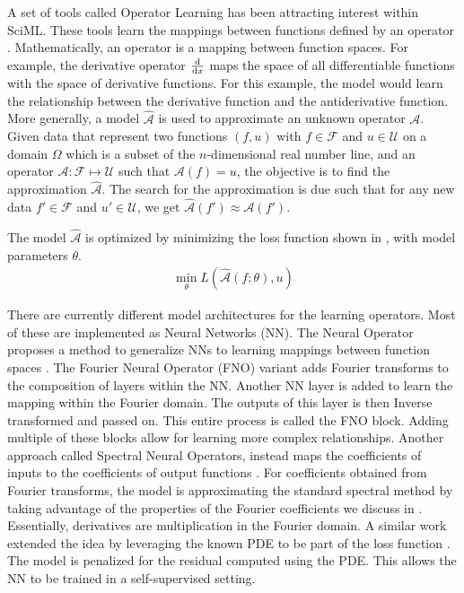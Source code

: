A set of tools called Operator Learning has been attracting interest within SciML\@. These tools learn the mappings between functions defined by an operator \autocite{JMLR:v24:21-1524,boulleMathematicalGuideOperator2024}. Mathematically, an operator is a mapping between function spaces. For example, the derivative operator \(\dv{x}\) maps the space of all differentiable functions with the space of derivative functions. For this example, the model would learn the relationship between the derivative function and the antiderivative function. More generally, a model \(\hat{\mathcal{A}}\) is used to approximate an unknown operator \(\mathcal{A}\). Given data that represent two functions \((f,u)\) with \(f\in\mathcal{F}\) and \(u\in\mathcal{U}\) on a domain \(\Omega{}\) which is a subset of the \(n\)-dimensional real number line, and an operator \(\mathcal{A}:\mathcal{F}\mapsto\mathcal{U}\) such that \(\mathcal{A}(f)=u\), the objective is to find the approximation \(\hat{\mathcal{A}}\). The search for the approximation is due such that for any new data \(f'\in\mathcal{F}\) and \(u'\in\mathcal{U}\), we get \(\hat{\mathcal{A}}(f')\approx\mathcal{A}(f')\).

The model \(\hat{\mathcal{A}}\) is optimized by minimizing the loss function shown in , with model parameters \(\theta{}\).
\begin{align}
  \min_{\theta} L\left(\hat{\mathcal{A}}\left(f;\theta\right),u\right)\label{eq:operator_learning_loss}
\end{align}

There are currently different model architectures for the learning operators. Most of these are implemented as Neural Networks (NN). The Neural Operator proposes a method to generalize NNs to learning mappings between function spaces \autocite{li2021fourier}. The Fourier Neural Operator (FNO) variant adds Fourier transforms to the composition of layers within the NN\@. Another NN layer is added to learn the mapping within the Fourier domain. The outputs of this layer is then Inverse transformed and passed on. This entire process is called the FNO block. Adding multiple of these blocks allow for learning more complex relationships. Another approach called Spectral Neural Operators, instead maps the coefficients of inputs to the coefficients of output functions \autocite{fanaskovSpectralNeuralOperators2023}. For coefficients obtained from Fourier transforms, the model is approximating the standard spectral method by taking advantage of the properties of the Fourier coefficients we discuss in . Essentially, derivatives are multiplication in the Fourier domain. A similar work extended the idea by leveraging the known PDE to be part of the loss function \autocite{du2024neural}. The model is penalized for the residual computed using the PDE\@. This allows the NN to be trained in a self-supervised setting.


